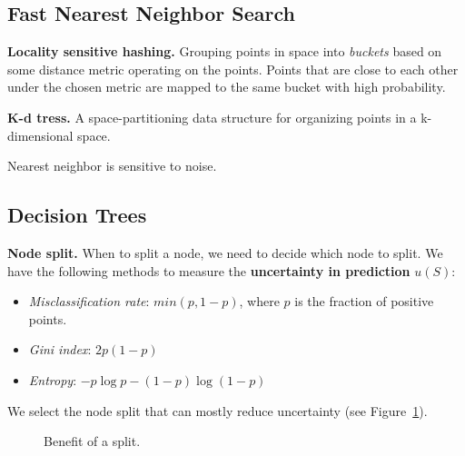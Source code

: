 \subsection{Fast Nearest Neighbor Search}
\textbf{Locality sensitive hashing.}\hspace{0.2cm} Grouping points in space into \textit{buckets} based on some distance metric operating on the points. Points that are close to each other under the chosen metric are mapped to the same bucket with high probability.

\textbf{K-d tress.}\hspace{0.2cm} A space-partitioning data structure for organizing points in a k-dimensional space.

\begin{remark}
	Nearest neighbor is sensitive to noise.
\end{remark}

\subsection{Decision Trees}
\textbf{Node split.}\hspace{0.2cm} When to split a node, we need to decide which 
node to split. We have the following methods to measure the \textbf{uncertainty in prediction} $u(S)$:
\begin{itemize}
	\item \textit{Misclassification rate}: $min(p, 1-p)$, where $p$ is the fraction of positive points.
	\item \textit{Gini index}: $2p(1-p)$
	\item \textit{Entropy}: $-p\log p - (1-p)\log(1-p)$
\end{itemize}
We select the node split that can mostly reduce uncertainty (see Figure~\ref{fig:feb-dt-split}).
\begin{figure}[h]
	\label{fig:feb-dt-split}
	\caption{Benefit of a split.}
\end{figure} 


